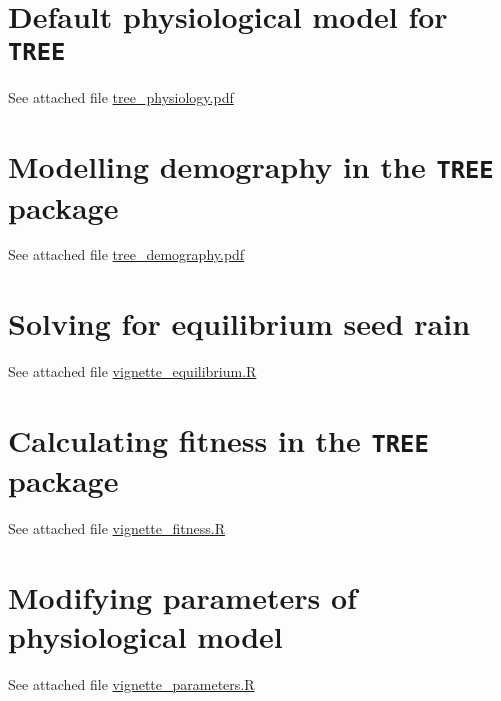 \documentclass[a4paper,11pt]{article}
\begin{document}
\begin{appendices}\label{sec:appendices}

\section{Default physiological model for \texttt{TREE}}\label{sec:FFW16}

See attached file \url{tree_physiology.pdf}

\section{Modelling demography in the \texttt{TREE} package}\label{sec:demography}

See attached file \url{tree_demography.pdf}

\section{Solving for equilibrium seed rain}\label{sec:seed}

See attached file \url{vignette_equilibrium.R}

\section{Calculating fitness in the \texttt{TREE} package}\label{sec:fitness}

See attached file \url{vignette_fitness.R}

\section{Modifying parameters of physiological model}\label{sec:parameters}

See attached file \url{vignette_parameters.R}

\end{appendices}
\end{document}

